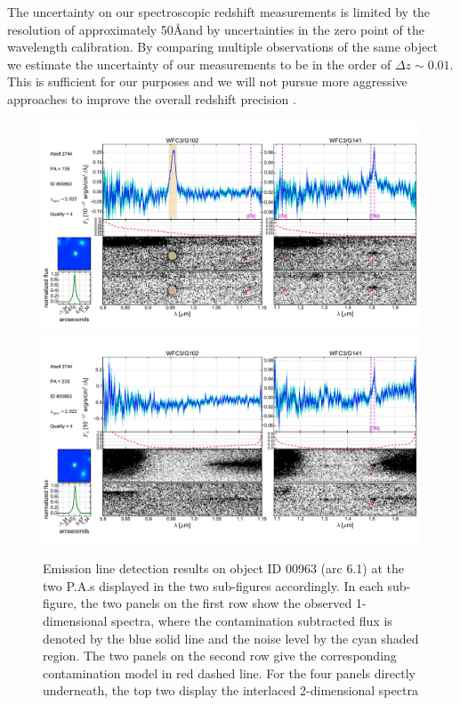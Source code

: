 The uncertainty on our spectroscopic redshift measurements is limited
by the resolution of approximately 50\AA and by uncertainties in the
zero point of the wavelength calibration. By comparing multiple
observations of the same object we estimate the uncertainty of our
measurements to be in the order of $\Delta z\sim 0.01$. This is
sufficient for our purposes and we will not pursue more aggressive
approaches to improve the overall redshift precision
\citep[e.g.][]{Brammer:2012p12977}.

\begin{figure}
    \centering
    \includegraphics[width=.8\textwidth]{fig/clA2744_id963_pa135_zsQ4.pdf}\\
    \includegraphics[width=.8\textwidth]{fig/clA2744_id963_pa233_zsQ4.pdf}
    \caption[Emission line detection results on object ID 00963 (arc 6.1).]{Emission line detection results on object ID 00963 (arc 6.1) at the two P.A.s displayed in the two
    sub-figures accordingly. In each sub-figure, the two panels on the first row show the observed 1-dimensional
    spectra, where the contamination subtracted flux is denoted by the blue solid line and the noise level by the
    cyan shaded region. The two panels on the second row give the corresponding contamination model in red dashed
    line. For the four panels directly underneath, the top two display the interlaced 2-dimensional spectra
}
\end{figure}

